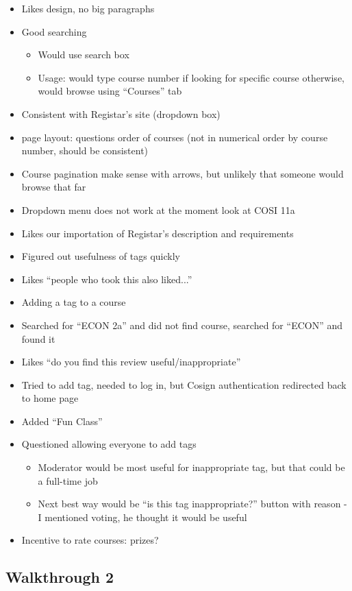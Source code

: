 \documentclass[12pt]{report}
\begin{document}
\begin{itemize}
\item Likes design, no big paragraphs
\item Good searching
	\begin{itemize}
    \item Would use search box
    \item Usage: would type course number if looking for specific course otherwise, would browse using ``Courses'' tab 
    \end{itemize}
\item Consistent with Registar's site (dropdown box)
\item page layout: questions order of courses (not in numerical order by course number, should be consistent)
\item Course pagination make sense with arrows, but unlikely that someone would browse that far
\item Dropdown menu does not work at the moment look at COSI 11a
\item Likes our importation of Registar's description and requirements
\item Figured out usefulness of tags quickly
\item Likes ``people who took this also liked...''
\item Adding a tag to a course
\item Searched for ``ECON 2a'' and did not find course, searched for ``ECON'' and found it
\item Likes ``do you find this review useful/inappropriate''
\item Tried to add tag, needed to log in, but Cosign authentication redirected back to home page
\item Added ``Fun Class''

\item Questioned allowing everyone to add tags
    \begin{itemize}
    \item Moderator would be most useful for inappropriate tag, but that could be a full-time job
    \item Next best way would be ``is this tag inappropriate?'' button with reason - I mentioned voting, he thought it would be useful 
    \end{itemize}

\item Incentive to rate courses: prizes?
\end{itemize}

\subsection{Walkthrough 2}
\end{document}
